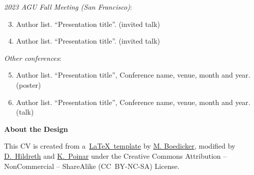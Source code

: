 \documentclass[letterpaper,11pt]{article}
\makeatletter
\renewenvironment{description}%
               {\list{}{\leftmargin=5pt %
                        \labelwidth\z@ \itemindent-\leftmargin
                        \let\makelabel\descriptionlabel}}%
               {\endlist}
\newcommand{\resheading}[1]{{\large \colorbox{mygrey}{\begin{minipage}{\textwidth}{\textbf{#1 \vphantom{p\^{E}}}}\end{minipage}}}}
\makeatother
\begin{document}
	
\begin{description}
		\item \textit{{2023 AGU Fall Meeting} (San Francisco)}: 
		\vspace{-10pt}
		
		\begin{enumerate} 	
		\setcounter{enumi}{2} 	
		
		\item Author list.  ``Presentation title''.   (invited talk)
		
		\item  Author list.  ``Presentation title''.  (invited talk)
		
		\end{enumerate}
		
		
	\item \textit{Other conferences}:
		\vspace{-10pt}
		
		\begin{enumerate}	
		\setcounter{enumi}{4} 
			
		\item  Author list.  ``Presentation title'', Conference name, venue, month and year. (poster)
		
		\item Author list.  ``Presentation title'', Conference name, venue, month and year.  (talk)
		

		\end{enumerate}

	\end{description}
	







\resheading{About the Design}

\vspace{10pt} 

This CV is created from a~\href{https://web.archive.org/web/20180727051638/http://www.derekhildreth.com/portfolio/Resume/Derek_Hildreth_Resume.tex}{\LaTeX~template} by \href{https://web.archive.org/web/20180727051638/http://www.thelinuxdaily.com/2008/10/latex-resume-examples/}{M. Boedicker}, modified by \href{http://www.derekhildreth.com}{D.~Hildreth} and \href{https://github.com/kpoinar}{K.~Poinar} under the Creative Commons Attribution -- NonCommercial -- ShareAlike (CC~BY-NC-SA) License.
\end{document}
